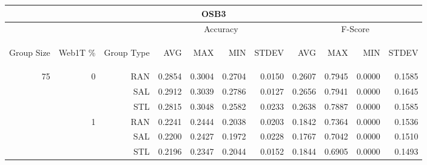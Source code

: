 \begin{center}
\begin{table}[htbp]
\begin{tabular}{ | r | r | r | r | r | r | r | r | r | r | r |}
\hline
\multicolumn{11}{|c|}{OSB3}\\
\hline
 & & & \multicolumn{4}{|c|}{Accuracy} & \multicolumn{4}{|c|}{F-Score}\\ \cline{4-11}
\begin{sideways}Group Size\end{sideways} & \begin{sideways}Web1T \%\end{sideways} & \begin{sideways}Group Type\end{sideways} & \begin{sideways}AVG\end{sideways} & \begin{sideways}MAX\end{sideways} & \begin{sideways}MIN\end{sideways} & \begin{sideways}STDEV\end{sideways} & \begin{sideways}AVG\end{sideways} & \begin{sideways}MAX\end{sideways} & \begin{sideways}MIN\end{sideways} & \begin{sideways}STDEV\end{sideways}\\
\hline
\multirow{18}{*}{75}
 & \multirow{3}{*}{0} & RAN & 0.2854 & 0.3004 & 0.2704 & 0.0150 & 0.2607 & 0.7945 & 0.0000 & 0.1585\\ \cline{3-11}
 &   & SAL & 0.2912 & 0.3039 & 0.2786 & 0.0127 & 0.2656 & 0.7941 & 0.0000 & 0.1645\\ \cline{3-11}
 &   & STL & 0.2815 & 0.3048 & 0.2582 & 0.0233 & 0.2638 & 0.7887 & 0.0000 & 0.1585\\ \cline{2-11}
 & \multirow{3}{*}{1} & RAN & 0.2241 & 0.2444 & 0.2038 & 0.0203 & 0.1842 & 0.7364 & 0.0000 & 0.1536\\ \cline{3-11}
 &   & SAL & 0.2200 & 0.2427 & 0.1972 & 0.0228 & 0.1767 & 0.7042 & 0.0000 & 0.1510\\ \cline{3-11}
 &   & STL & 0.2196 & 0.2347 & 0.2044 & 0.0152 & 0.1844 & 0.6905 & 0.0000 & 0.1493\\ \cline{2-11}

\end{tabular}
\end{table}
\end{center}
